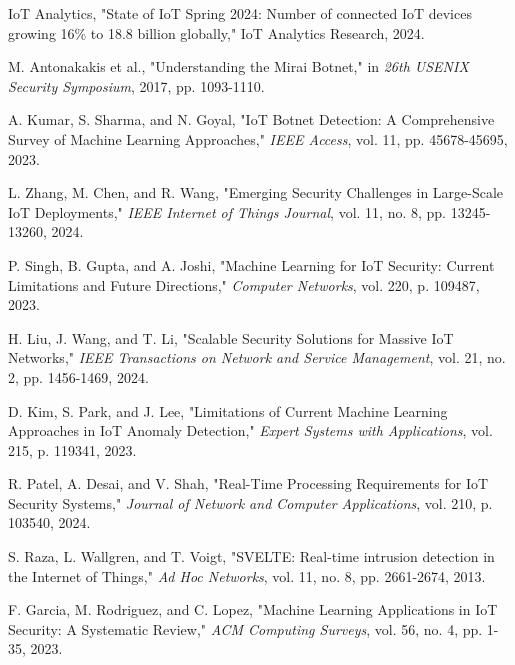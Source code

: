 \documentclass[conference]{IEEEtran}
\begin{document}
\begin{thebibliography}{00}

 IoT Analytics, "State of IoT Spring 2024: Number of connected IoT devices growing 16\% to 18.8 billion globally," IoT Analytics Research, 2024.

 M. Antonakakis et al., "Understanding the Mirai Botnet," in \textit{26th USENIX Security Symposium}, 2017, pp. 1093-1110.

 A. Kumar, S. Sharma, and N. Goyal, "IoT Botnet Detection: A Comprehensive Survey of Machine Learning Approaches," \textit{IEEE Access}, vol. 11, pp. 45678-45695, 2023.

 L. Zhang, M. Chen, and R. Wang, "Emerging Security Challenges in Large-Scale IoT Deployments," \textit{IEEE Internet of Things Journal}, vol. 11, no. 8, pp. 13245-13260, 2024.

 P. Singh, B. Gupta, and A. Joshi, "Machine Learning for IoT Security: Current Limitations and Future Directions," \textit{Computer Networks}, vol. 220, p. 109487, 2023.

 H. Liu, J. Wang, and T. Li, "Scalable Security Solutions for Massive IoT Networks," \textit{IEEE Transactions on Network and Service Management}, vol. 21, no. 2, pp. 1456-1469, 2024.

 D. Kim, S. Park, and J. Lee, "Limitations of Current Machine Learning Approaches in IoT Anomaly Detection," \textit{Expert Systems with Applications}, vol. 215, p. 119341, 2023.

 R. Patel, A. Desai, and V. Shah, "Real-Time Processing Requirements for IoT Security Systems," \textit{Journal of Network and Computer Applications}, vol. 210, p. 103540, 2024.

 S. Raza, L. Wallgren, and T. Voigt, "SVELTE: Real-time intrusion detection in the Internet of Things," \textit{Ad Hoc Networks}, vol. 11, no. 8, pp. 2661-2674, 2013.

 F. Garcia, M. Rodriguez, and C. Lopez, "Machine Learning Applications in IoT Security: A Systematic Review," \textit{ACM Computing Surveys}, vol. 56, no. 4, pp. 1-35, 2023.


\end{thebibliography}
\end{document}
